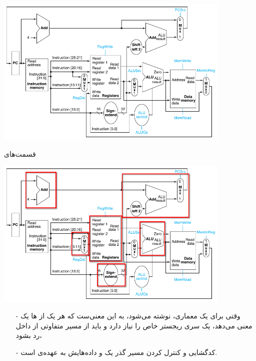 \begin{frame}{}
\begin{center}
\includegraphics[width=0.85\textwidth, height=0.9\textheight]{docs/images/datapath-clear}
\end{center}
\end{frame}

\begin{frame}{قسمت‌های }
\begin{center}
\includegraphics[width=0.85\textwidth, height=0.9\textheight]{docs/images/datapath-parts}
\end{center}
\end{frame}

\begin{frame}{}
\begin{itemize}\itemr
\item[-]
وقتی برای یک معماری، 
نوشته می‌شود، به این معنی‌ست که هر یک از 
ها یک معنی می‌دهد، یک سری ریجستر خاص را نیاز دارد و باید از مسیر متفاوتی از داخل 
رد بشود،
\item[-]
کدگشایی و کنترل کردن مسیر گذر یک 
و داده‌هایش به عهده‌ی 
است.
\end{itemize}
\end{frame}

